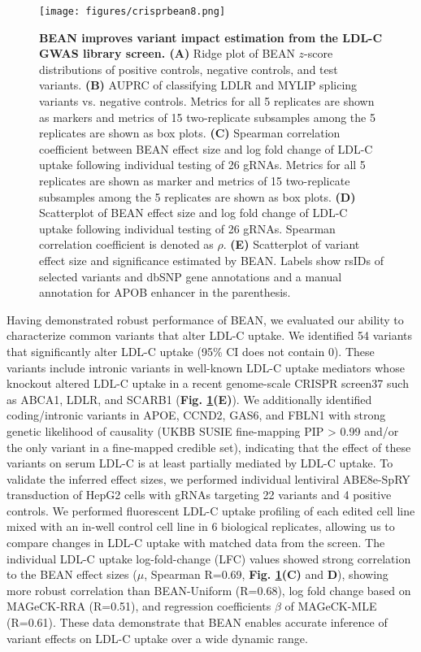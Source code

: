 \documentclass[a4paper, titlepage, openright]{book}
\begin{document}
\begin{figure}
	\centering
	\texttt{[image: figures/crisprbean8.png]}
	\caption[BEAN improves variant impact estimation from the LDL-C GWAS library screen]{\textbf{BEAN improves variant impact estimation from the LDL-C GWAS library screen.  (A)} Ridge plot of BEAN $z$-score distributions of positive controls, negative controls, and test variants. \textbf{(B)} AUPRC of classifying LDLR and MYLIP splicing variants vs.  negative controls. Metrics for all 5 replicates are shown as markers and metrics of 15 two-replicate subsamples among the 5 replicates are shown as box plots. \textbf{(C)} Spearman correlation coefficient between BEAN effect size and log fold change of LDL-C uptake following individual testing of 26 gRNAs. Metrics for all 5 replicates are shown as marker and metrics of 15 two-replicate subsamples among the 5 replicates are shown as box plots. \textbf{(D)} Scatterplot of BEAN effect size and log fold change of LDL-C uptake following individual testing of 26 gRNAs. Spearman correlation coefficient is denoted as $\rho$. \textbf{(E)} Scatterplot of variant effect size and significance estimated by BEAN. Labels show rsIDs of selected variants and dbSNP gene annotations and a manual annotation for APOB enhancer in the parenthesis.}
	\label{fig:crisprbean8}
\end{figure} 
Having demonstrated robust performance of BEAN, we evaluated our ability to characterize common variants that alter LDL-C uptake. We identified 54 variants that significantly alter LDL-C uptake (95\% CI does not contain 0). These variants include intronic variants in well-known LDL-C uptake mediators whose knockout altered LDL-C uptake in a recent genome-scale CRISPR screen37 such as ABCA1, LDLR, and SCARB1 (\textbf{Fig. \ref{fig:crisprbean8}(E)}). We additionally identified coding/intronic variants in APOE, CCND2, GAS6, and FBLN1 with strong genetic likelihood of causality (UKBB SUSIE fine-mapping PIP > 0.99 and/or the only variant in a fine-mapped credible set\citep{graham2021power}), indicating that the effect of these variants on serum LDL-C is at least partially mediated by LDL-C uptake. To validate the inferred effect sizes, we performed individual lentiviral ABE8e-SpRY transduction of HepG2 cells with gRNAs targeting 22 variants and 4 positive controls. We performed fluorescent LDL-C uptake profiling of each edited cell line mixed with an in-well control cell line in 6 biological replicates, allowing us to compare changes in LDL-C uptake with matched data from the screen. The individual LDL-C uptake log-fold-change (LFC) values showed strong correlation to the BEAN effect sizes ($\mu$, Spearman R=0.69, \textbf{Fig. \ref{fig:crisprbean8}(C)} and \textbf{D}), showing more robust correlation than BEAN-Uniform (R=0.68), log fold change based on MAGeCK-RRA (R=0.51), and regression coefficients $\beta$ of MAGeCK-MLE (R=0.61). These data demonstrate that BEAN enables accurate inference of variant effects on LDL-C uptake over a wide dynamic range.
\end{document}
